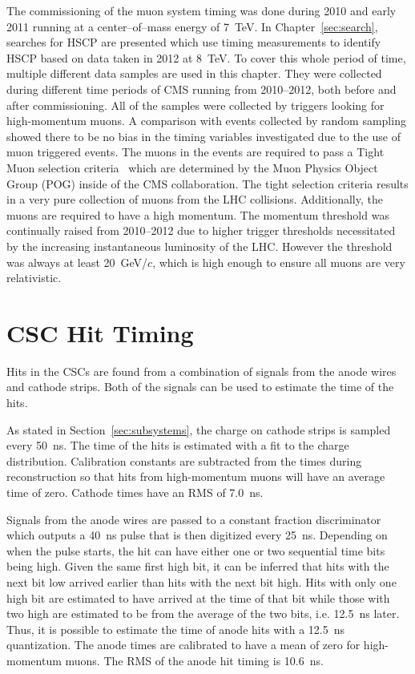 The commissioning of the muon system timing was done during 2010 and early 2011 running at a center--of--mass energy of 7~TeV.
In Chapter~\ref{sec:search}, searches for HSCP are presented which use
timing measurements to identify HSCP based on data taken in 2012 at 8~TeV.
To cover this whole period of time,
multiple different data samples are used in this chapter. They were collected during different time periods of CMS running from 2010--2012, both before and after commissioning.
All of the samples were collected by triggers looking for high-momentum muons. A comparison with events collected by random sampling showed there to be no
bias in the timing variables investigated due to the use of muon triggered events.
The muons in the events are required to pass a Tight Muon selection 
criteria~\cite{2012JInst...7P0002T} which are determined by the Muon Physics Object Group (POG) inside of the CMS collaboration.
The tight selection criteria results in a very pure collection of muons from the LHC collisions.
Additionally, the muons are required to have a high momentum. The momentum threshold was continually raised from 2010--2012 due to higher trigger thresholds
necessitated by the increasing instantaneous luminosity of the LHC.
However the threshold was always at least 20~GeV/$c$, which is high enough to ensure all muons are very relativistic.

\section{CSC Hit Timing}
Hits in the CSCs are found from a combination of signals from the anode wires and cathode strips. Both of the signals can be used to estimate the time of the hits.

As stated in Section~\ref{sec:subsystems}, the charge on cathode strips is sampled every 50~ns.
The time of the hits is estimated with a fit to the charge distribution. Calibration constants are subtracted from the times during reconstruction 
so that hits from high-momentum muons will have an average time of zero.
Cathode times have an RMS of 7.0~ns.

Signals from the anode wires are passed to a constant fraction discriminator which outputs a 40~ns pulse
that is then digitized every 25~ns. Depending on when the pulse starts, the hit can have either one or two sequential time bits being high. Given the same
first high bit, it can be inferred that hits with the next bit low arrived earlier than hits with the next bit high.
Hits with only one high bit are estimated to have arrived at the time of that bit while those with two high are estimated to be from the average of the two bits, i.e. 12.5~ns
later.
Thus, it is possible to estimate the time of anode hits with a 12.5~ns quantization. The anode times are calibrated to have a mean of zero 
for high-momentum muons. The RMS of the anode hit timing is 10.6~ns.


